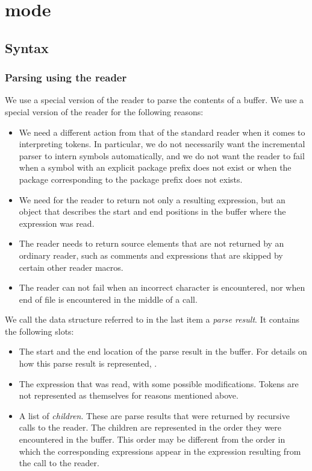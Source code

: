\chapter{\commonlisp{} mode}

\section{Syntax}

\subsection{Parsing using the \commonlisp{} reader}

We use a special version of the \commonlisp{} reader to parse the
contents of a buffer.  We use a special version of the reader for the
following reasons:

\begin{itemize}
\item We need a different action from that of the standard reader when
  it comes to interpreting tokens.  In particular, we do not
  necessarily want the incremental parser to intern symbols
  automatically, and we do not want the reader to fail when a symbol
  with an explicit package prefix does not exist or when the package
  corresponding to the package prefix does not exists.
\item We need for the reader to return not only a resulting
  expression, but an object that describes the start and end positions
  in the buffer where the expression was read.
\item The reader needs to return source elements that are not returned
  by an ordinary reader, such as comments and expressions that are
  skipped by certain other reader macros.
\item The reader can not fail when an incorrect character is
  encountered, nor when end of file is encountered in the middle of a
  call.
\end{itemize}

We call the data structure referred to in the last item a \emph{parse
  result}.  It contains the following slots:

\begin{itemize}
\item The start and the end location of the parse result in the
  buffer.  For details on how this parse result is represented,
  .
\item The expression that was read, with some possible modifications.
  Tokens are not represented as themselves for reasons mentioned
  above.
\item A list of \emph{children}.  These are parse results that were
  returned by recursive calls to the reader.  The children are
  represented in the order they were encountered in the buffer.  This
  order may be different from the order in which the corresponding
  expressions appear in the expression resulting from the call to the
  reader.
\end{itemize}

